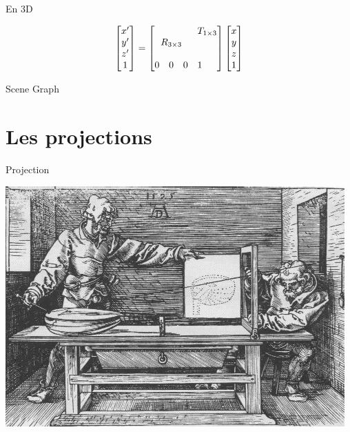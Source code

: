 \documentclass[compress]{beamer}
\def\block(#1,#2)#3{\multicolumn{#2}{c}{\multirow{#1}{*}{$ #3 $}}}
\begin{document}
\begin{frame}{En 3D}
\begin{center}
\[
\begin{bmatrix} x' \\ y' \\ z' \\ 1 \end{bmatrix} = \begin{bmatrix}
    \block(3,3){R_{3 \times 3}} & \block(1,3){T_{1 \times 3}} \\
                 &  &  &  \\
                 &  &  &  \\
                 0 & 0  & 0 & 1
\end{bmatrix} \begin{bmatrix} x \\ y \\ z \\ 1 \end{bmatrix}
\]

\end{center}
\end{frame}

\begin{frame}{Scene Graph}
    \begin{center}

    \end{center}
\end{frame}

\section{Les projections}


\begin{frame}{Projection}
    \begin{center}
        \includegraphics[width=0.8\linewidth]{durer-projection}
    \end{center}
\end{frame}
\end{document}
